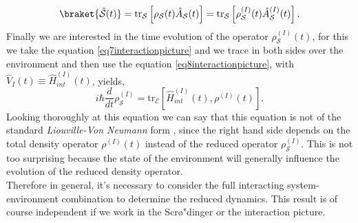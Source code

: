 \begin{appendix}
{\[\]
}
\begin{equation}
\braket{\hat{\mathcal{S}}(t)}=\text{tr}_{\mathcal{S}}\left[\rho_{\mathcal{S}}(t)\hat{A}_{\mathcal{S}}(t)\right]=\text{tr}_{\mathcal{S}}\left[\rho_{\mathcal{S}}^{(I)}(t)\hat{A}_{\mathcal{S}}^{(I)}(t)\right].
\label{eq10interactionpicture}
\end{equation}
Finally we are interested in the time evolution of the operator $\rho_{\mathcal{S}}^{(I)}(t)$, for this we take the equation \eqref{eq7interactionpicture} and we trace in both sides over the environment and then use the equation \eqref{eq8interactionpicture}, with $\hat{V}_I(t)\equiv\hat{H}_{int}^{(I)}(t)$, yields,
\begin{equation}
i\hbar\frac{d}{dt}\rho_{\mathcal{S}}^{(I)}=\text{tr}_{\mathcal{E}}\left[\hat{H}_{int}^{(I)}(t),\rho^{(I)}(t)\right].
\label{eq11interactionpicture}
\end{equation}
Looking thoroughly at this equation we can say that this equation is not of the standard \textit{Liouville-Von Neumann} form , since the right hand side depends on the total density operator $\rho^{(I)}(t)$ instead of the reduced operator $\rho^{(I)}_{\mathcal{S}}$. This is not too surprising because the state of the environment will generally influence the evolution of the reduced density operator.\\
Therefore in general, it's necessary to consider the full interacting system-environment combination to determine the reduced dynamics. This result is of course independent if we work in the Scr{\o"}dinger or the interaction picture. 
  

\end{appendix}
